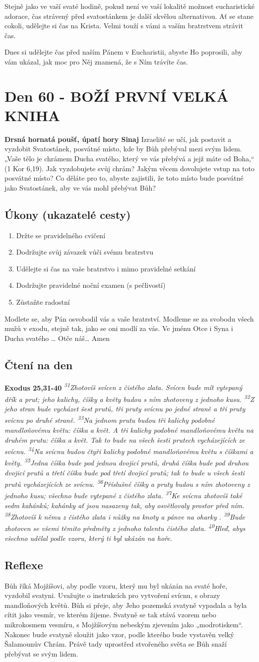 \documentclass[11pt]{article}
\newcommand{\zacatekDevatyTyden}{
\textbf{Drsná hornatá poušť, úpatí hory Sinaj} \newline 
Izraelité se učí, jak postavit a vyzdobit Svatostánek, posvátné místo, kde by Bůh přebýval mezi svým lidem. „Vaše tělo je chrámem Ducha svatého, který ve vás přebývá a jejž máte od Boha,“ (1 Kor 6,19). Jak vyzdobujete svůj chrám? Jakým věcem dovolujete vstup na toto posvátné místo? Co děláte pro to, abyste zajistili, že toto místo bude posvátné jako Svatostánek, aby ve vás mohl přebývat Bůh?

\subsection*{Úkony (ukazatelé cesty)}
\begin{enumerate}
  \item Držte se pravidelného cvičení
  \item Dodržujte svůj závazek vůči svému bratrstvu
  \item Udělejte si čas na vaše bratrstvo i mimo pravidelné setkání
  \item Dodržujte pravidelné noční examen (s pečlivostí)
  \item Zůstaňte radostní
\end{enumerate}
Modlete se, aby Pán osvobodil vás a vaše bratrství. \newline
Modleme se za svobodu všech mužů v exodu, stejně tak, jako se oni modlí za vás.\newline
Ve jménu Otce i Syna i Ducha svatého …  Otče náš… Amen
}
\begin{document}
Stejně jako ve vaší svaté hodině, pokud není ve vaší lokalitě možnost eucharistické adorace, čas strávený před svatostánkem je
další skvělou alternativou. Ať se stane cokoli, udělejte si čas na Krista. Velmi touží s vámi a vaším bratrstvem strávit čas.

Dnes si udělejte čas před naším Pánem v Eucharistii, abyste Ho poprosili, aby vám ukázal, jak moc pro Něj znamená, že s Ním
trávíte čas.


\newpage
\section{Den 60 - BOŽÍ PRVNÍ VELKÁ KNIHA}
\zacatekDevatyTyden
\subsection*{Čtení na den}
\textbf{Exodus 25,31-40}
\newline
\textit{
\textsuperscript{31}Zhotovíš svícen z čistého zlata. Svícen bude mít vytepaný dřík a prut; jeho kalichy, číšky a květy budou s ním zhotoveny z jednoho kusu.
\textsuperscript{32}Z jeho stran bude vycházet šest prutů, tři pruty svícnu po jedné straně a tři pruty svícnu po druhé straně.
\textsuperscript{33}Na jednom prutu budou tři kalichy podobné mandloňovému květu: číška a květ. A tři kalichy podobné mandloňovému květu na druhém prutu: číška a květ. Tak to bude na všech šesti prutech vycházejících ze svícnu.
\textsuperscript{34}Na svícnu budou čtyři kalichy podobné mandloňovému květu s číškami a květy.
\textsuperscript{35}Jedna číška bude pod jednou dvojicí prutů, druhá číška bude pod druhou dvojicí prutů a třetí číška bude pod třetí dvojicí prutů; tak to bude u všech šesti prutů vycházejících ze svícnu.
\textsuperscript{36}Příslušné číšky a pruty budou s ním zhotoveny z jednoho kusu; všechno bude vytepané z čistého zlata.
\textsuperscript{37}Ke svícnu zhotovíš také sedm kahánků; kahánky ať jsou nasazeny tak, aby osvětlovaly prostor před ním.
\textsuperscript{38}Zhotovíš k němu z čistého zlata i nůžky na knoty a pánve na oharky .
\textsuperscript{39}Bude zhotoven se všemi těmito předměty z jednoho talentu čistého zlata.
\textsuperscript{40}Hleď, abys všechno udělal podle vzoru, který ti byl ukázán na hoře.
}

\subsection*{Reflexe}
Bůh říká Mojžíšovi, aby podle vzoru, který mu byl ukázán na svaté hoře, vyzdobil svatyni. Uvažujte o instrukcích pro
vytvoření svícnu, s obrazy mandloňových květů. Bůh si přeje, aby Jeho pozemská svatyně vypadala a byla cítit jako
vesmír, ve kterém žijeme. Svatyně se tak stává vzorem nebo mikrokosmem vesmíru, s Mojžíšovým nebeským
zjevením jako „modrotiskem“. Nakonec bude svatyně sloužit jako vzor, podle kterého bude vystavěn velký
Šalamounův Chrám. Právě tady uprostřed stvořeného světa se Bůh snaží přebývat se svým lidem.
\end{document}
